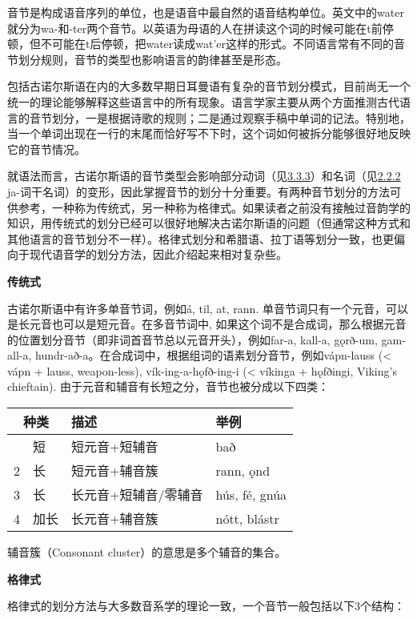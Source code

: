 音节是构成语音序列的单位，也是语音中最自然的语音结构单位。英文中的water就分为wa-和-ter两个音节。以英语为母语的人在拼读这个词的时候可能在t前停顿，但不可能在t后停顿，把water读成wat'er这样的形式。不同语言常有不同的音节划分规则，音节的类型也影响语言的韵律甚至是形态。

包括古诺尔斯语在内的大多数早期日耳曼语有复杂的音节划分模式，目前尚无一个统一的理论能够解释这些语言中的所有现象。语言学家主要从两个方面推测古代语言的音节划分，一是根据诗歌的规则；二是通过观察手稿中单词的记法。特别地，当一个单词出现在一行的末尾而恰好写不下时，这个词如何被拆分能够很好地反映它的音节情况。

就语法而言，古诺尔斯语的音节类型会影响部分动词（见\hyperref[ux7b2cux4e00ux5f31ux53d8ux4f4dux6cd5]{3.3.3}）和名词（见\hyperref[ajawa-ux8bcdux5e72]{2.2.2}
ja-词干名词）的变形，因此掌握音节的划分十分重要。有两种音节划分的方法可供参考，一种称为传统式，另一种称为格律式。如果读者之前没有接触过音韵学的知识，用传统式的划分已经可以很好地解决古诺尔斯语的问题（但通常这种方式和其他语言的音节划分不一样）。格律式划分和希腊语、拉丁语等划分一致，也更偏向于现代语音学的划分方法，因此介绍起来相对复杂些。

\textbf{传统式}

古诺尔斯语中有许多单音节词，例如á, til, at, rann.
单音节词只有一个元音，可以是长元音也可以是短元音。在多音节词中,
如果这个词不是合成词，那么根据元音的位置划分音节（即非词首音节总以元音开头），例如far-a,
kall-a, gǫrð-um, gam-all-a,
hundr-að-a。在合成词中，根据组词的语素划分音节，例如vápn-lauss
(\textless{} vápn + lauss, weapon-less), vík-ing-a-hǫfð-ing-i
(\textless{} víkinga + hǫfðingi, Viking's chieftain).
由于元音和辅音有长短之分，音节也被分成以下四类：

\begin{longtable}{llll}
\toprule
\multicolumn{2}{c}{种类} & 描述 & 举例 \\
\midrule
\endhead
\bottomrule
\endfoot
1 & 短 & 短元音+短辅音 & bað \\
2 & 长 & 短元音+辅音簇 & rann, ǫnd \\
3 & 长 & 长元音+短辅音/零辅音 & hús, fé, gnúa \\
4 & 加长 & 长元音+辅音簇 & nótt, blástr \\
\end{longtable}

辅音簇（Consonant cluster）的意思是多个辅音的集合。

\textbf{格律式}

格律式的划分方法与大多数音系学的理论一致，一个音节一般包括以下3个结构：

